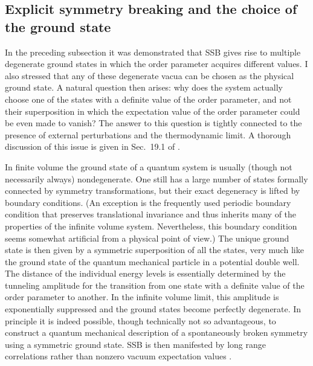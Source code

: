 \documentclass[final,3p,times,12pt,a4paper,sort&compress]{elsarticle}
\begin{document}
\subsection{Explicit symmetry breaking and the choice of the ground state}
In the preceding subsection it was demonstrated that SSB gives rise to multiple
degenerate ground states in which the order parameter acquires different
values. I also stressed that any of these degenerate vacua can be chosen as the
physical ground state. A natural question then arises: why does the system
actually choose one of the states with a definite value of the order parameter,
and not their superposition in which the expectation value of the order
parameter could be even made to vanish? The answer to this question is tightly
connected to the presence of external perturbations and the thermodynamic limit.
A thorough discussion of this issue is given in Sec.~19.1 of
\cite{Weinberg:1996v2}.

In finite volume the ground state of a quantum system is usually (though not
necessarily always) nondegenerate. One still has a large number of states
formally connected by symmetry transformations, but their exact degeneracy is
lifted by boundary conditions. (An exception is the frequently used periodic
boundary condition that preserves translational invariance and thus inherits
many of the properties of the infinite volume system. Nevertheless, this
boundary condition seems somewhat artificial from a physical point of view.) The
unique ground state is then given by a symmetric superposition of all the
states, very much like the ground state of the quantum mechanical particle in a
potential double well. The distance of the individual energy levels is
essentially determined by the tunneling amplitude for the transition from one
state with a definite value of the order parameter to another. In the infinite
volume limit, this amplitude is exponentially suppressed and the ground states
become perfectly degenerate. In principle it is indeed possible, though
technically not so advantageous, to construct a quantum mechanical description
of a spontaneously broken symmetry using a symmetric ground state. SSB is then
manifested by long range correlations rather than nonzero vacuum expectation
values \cite{Yang:1962zz}.
\end{document}
